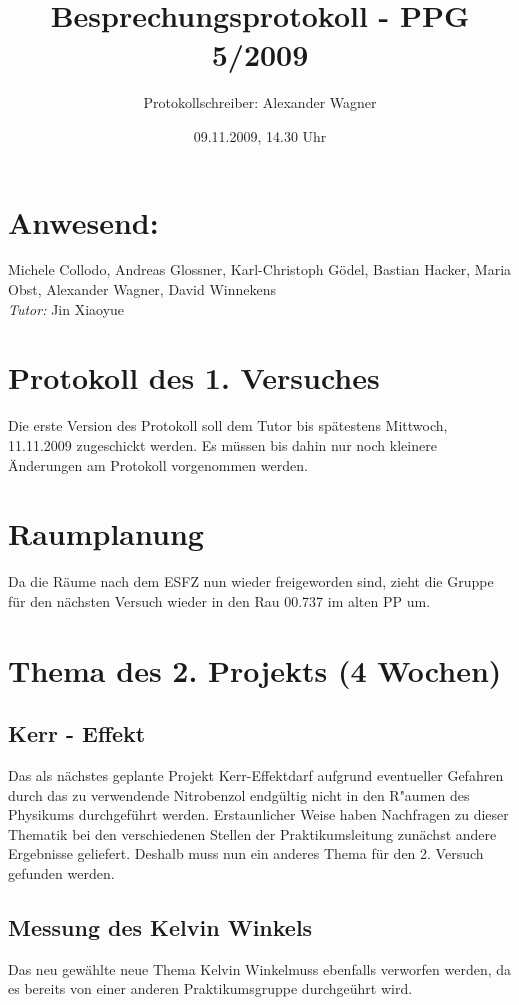\documentclass[11pt]{scrartcl}
\title{Besprechungsprotokoll - PPG 5/2009}
\date{09.11.2009, 14.30 Uhr}
\author{Protokollschreiber: Alexander Wagner}
\begin{document}
\maketitle
\pagestyle{empty}
\section{Anwesend:} Michele Collodo, Andreas Glossner, Karl-Christoph G\"odel, Bastian Hacker, Maria Obst, Alexander Wagner, David Winnekens \\ \emph{Tutor:} Jin Xiaoyue 


\section{Protokoll des 1. Versuches} 
Die erste Version des Protokoll soll dem Tutor bis sp\"atestens Mittwoch, 11.11.2009 zugeschickt werden. Es m\"ussen bis dahin nur noch kleinere \"Anderungen am Protokoll vorgenommen werden. 

\section{Raumplanung} 
Da die R\"aume nach dem ESFZ nun wieder freigeworden sind, zieht die Gruppe f\"ur den n\"achsten Versuch wieder in den Rau 00.737 im alten PP um.

\section{Thema des 2. Projekts (4 Wochen)}
\subsection{Kerr - Effekt} Das als n\"achstes geplante Projekt \glqq Kerr-Effekt\grqq darf aufgrund eventueller Gefahren durch das zu verwendende Nitrobenzol endg\"ultig nicht in den R"aumen des Physikums durchgef\"uhrt werden. Erstaunlicher Weise haben Nachfragen zu dieser Thematik bei den verschiedenen Stellen der Praktikumsleitung zun\"achst andere Ergebnisse geliefert. Deshalb muss nun ein anderes Thema f\"ur den 2. Versuch gefunden werden.

\subsection{Messung des Kelvin Winkels}
Das neu gew\"ahlte neue Thema \glqq Kelvin Winkel\grqq  muss ebenfalls verworfen werden, da es bereits von einer anderen Praktikumsgruppe durchge\"uhrt wird.
\end{document}
